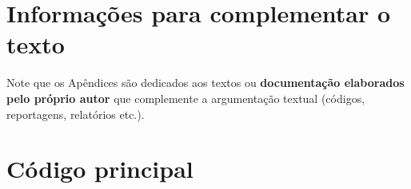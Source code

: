 
\begin{apendicesenv}
\chapter{Informações para complementar o texto}

Note que os Apêndices são dedicados aos textos ou \textbf{documentação elaborados pelo próprio autor} que complemente  a  argumentação  textual  (códigos,  reportagens,  relatórios  etc.).


\lipsum[8]


\chapter{Código principal}

\lipsum[8]

\end{apendicesenv}